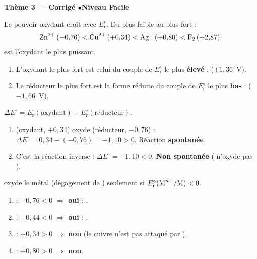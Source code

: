\documentclass[11pt,a4paper]{article}
\begin{document}
\begin{center}\color{primarydark}\large\bfseries Thème 3 — Corrigé \quad$\bullet$\quad Niveau Facile\end{center}

\begin{corrige}
Le pouvoir oxydant croît avec $E_{\mathrm{r}}^{\circ}$. Du plus faible au plus fort :
\[
\ce{Zn^{2+}}\,(-0{,}76) < \ce{Cu^{2+}}\,(+0{,}34) < \ce{Ag+}\,(+0{,}80) < \ce{F2}\,(+2{,}87).
\]
 est l'oxydant le plus puissant.
\end{corrige}

\begin{corrige}
\begin{enumerate}[label=\alph*)]
  \item L'oxydant le plus fort est celui du couple de $E_{\mathrm{r}}^{\circ}$ le plus \textbf{élevé} :
         ($+1{,}36$~V).
  \item Le réducteur le plus fort est la forme réduite du couple de $E_{\mathrm{r}}^{\circ}$ le plus
        \textbf{bas} :  ($-1{,}66$~V).
\end{enumerate}
\end{corrige}

\begin{corrige}
$\Delta E^{\circ}=E_{\mathrm{r}}^{\circ}(\text{oxydant})-E_{\mathrm{r}}^{\circ}(\text{réducteur})$.
\begin{enumerate}[label=\alph*)]
  \item {} (oxydant, $+0{,}34$) oxyde  (réducteur, $-0{,}76$) :
        $\Delta E^{\circ}=0{,}34-(-0{,}76)=+1{,}10>0$. Réaction \textbf{spontanée}.
  \item C'est la réaction inverse : $\Delta E^{\circ}=-1{,}10<0$. \textbf{Non spontanée}
        ( n'oxyde pas ).
\end{enumerate}
\end{corrige}

\begin{corrige}
 oxyde le métal (dégagement de ) seulement si
$E_{\mathrm{r}}^{\circ}(\ce{M^{n+}}/\ce{M})<0$.
\begin{enumerate}[label=\alph*)]
  \item {} : $-0{,}76<0$ $\Rightarrow$ \textbf{oui} : .
  \item {} : $-0{,}44<0$ $\Rightarrow$ \textbf{oui} : .
  \item {} : $+0{,}34>0$ $\Rightarrow$ \textbf{non} (le cuivre n'est pas attaqué par ).
  \item {} : $+0{,}80>0$ $\Rightarrow$ \textbf{non}.
\end{enumerate}
\end{corrige}
\end{document}
